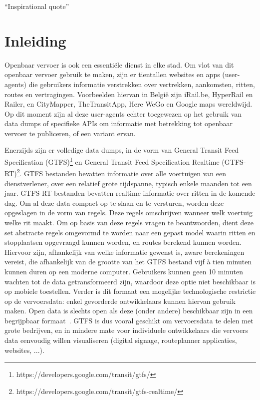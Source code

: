\begin{savequote}[0.55\linewidth]
	``Inspirational quote''
\end{savequote}

\chapter{Inleiding}
\label{chap:intro}
Openbaar vervoer is ook een essentiële dienst in elke stad\citep{programmableweb14}. Om vlot van dit openbaar vervoer gebruik te maken, zijn er tientallen websites en apps (user-agents) die gebruikers informatie verstrekken over vertrekken, aankomsten, ritten, routes en vertragingen. Voorbeelden hiervan in België zijn iRail.be, HyperRail en Railer, en CityMapper, TheTransitApp, Here WeGo en Google maps wereldwijd. Op dit moment zijn al deze user-agents echter toegewezen op het gebruik van data dumps of specifieke APIs om informatie met betrekking tot openbaar vervoer te publiceren, of een variant ervan. 

Enerzijds zijn er volledige data dumps, in de vorm van General Transit Feed Specification (GTFS)\footnote{https://developers.google.com/transit/gtfs/} en General Transit Feed Specification Realtime (GTFS-RT)\footnote{https://developers.google.com/transit/gtfs-realtime/}. GTFS bestanden bevatten informatie over alle voertuigen van een dienstverlener, over een relatief grote tijdspanne, typisch enkele maanden tot een jaar. GTFS-RT bestanden bevatten realtime informatie over ritten in de komende dag. Om al deze data compact op te slaan en te versturen, worden deze opgeslagen in de vorm van regels. Deze regels omschrijven wanneer welk voertuig welke rit maakt. Om op basis van deze regels vragen te beantwoorden, dient deze set abstracte regels omgevormd te worden naar een gepast model waarin ritten en stopplaatsen opgevraagd kunnen worden, en routes berekend kunnen worden. Hiervoor zijn, afhankelijk van welke informatie gewenst is, zware berekeningen vereist, die afhankelijk van de grootte van het GTFS bestand vijf à tien minuten kunnen duren op een moderne computer. Gebruikers kunnen geen 10 minuten wachten tot de data getransformeerd zijn, waardoor deze optie niet beschikbaar is op mobiele toestellen. Verder is dit formaat een mogelijke technologische restrictie op de vervoersdata: enkel gevorderde ontwikkelaars kunnen hiervan gebruik maken. Open data is slechts open als deze (onder andere) beschikbaar zijn in een begrijpbaar formaat~\citep{okfn18}. GTFS is dus vooral geschikt om vervoersdata te delen met grote bedrijven, en in mindere mate voor individuele ontwikkelaars die vervoers data eenvoudig willen visualiseren (digital signage, routeplanner applicaties, websites, ...).

